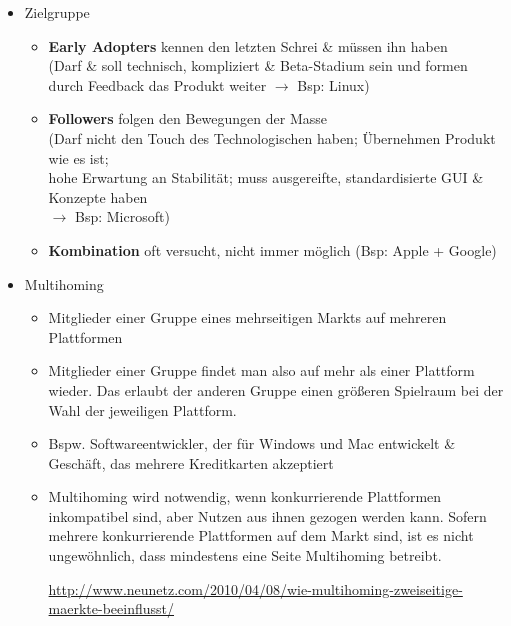 \documentclass{article} %
\begin{document}
\begin{itemize}
			\begin{itemize}
				\item Nutze Chancen zur Bindung, die bereits bestehen
				\item Positionierung \glqq nur\grqq als Feature bekannter Konzepte
				\item Enge Integration in bestehendes Produkte
			\end{itemize}
			\item Zielgruppe
			\begin{itemize}
				\item \textbf{Early Adopters} kennen den letzten Schrei \& müssen ihn haben\\
				(Darf \& soll technisch, kompliziert \& Beta-Stadium sein und formen durch Feedback das Produkt weiter $\rightarrow$ Bsp: Linux)
				\item \textbf{Followers} folgen den Bewegungen der Masse\\
(Darf nicht den Touch des Technologischen haben; Übernehmen Produkt wie es ist;\\
hohe Erwartung an Stabilität; muss ausgereifte, standardisierte GUI \& Konzepte haben \\
$\rightarrow$ Bsp: Microsoft)
				\item \textbf{Kombination} oft versucht, nicht immer möglich (Bsp: Apple + Google)
			\end{itemize}
			\item Multihoming
			\begin{itemize}
				\item Mitglieder einer Gruppe eines mehrseitigen Markts auf mehreren Plattformen
				\item Mitglieder einer Gruppe findet man also auf mehr als einer Plattform wieder. Das erlaubt der anderen Gruppe einen größeren Spielraum bei der Wahl der jeweiligen Plattform.
				\item Bspw. Softwareentwickler, der für Windows und Mac entwickelt \& Geschäft, das mehrere Kreditkarten akzeptiert
				\item Multihoming wird notwendig, wenn konkurrierende Plattformen inkompatibel sind, aber Nutzen aus ihnen gezogen werden kann. Sofern mehrere konkurrierende Plattformen auf dem Markt sind, ist es nicht ungewöhnlich, dass mindestens eine Seite Multihoming betreibt.

\url{http://www.neunetz.com/2010/04/08/wie-multihoming-zweiseitige-maerkte-beeinflusst/}
			\end{itemize}
		\end{itemize}
\end{document}
